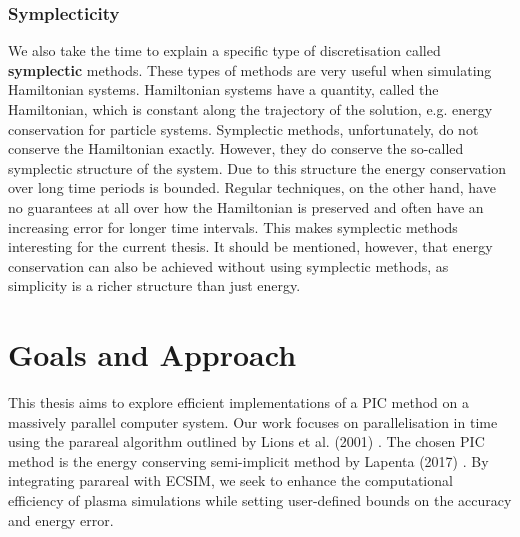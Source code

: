 \subsubsection{Symplecticity}
We also take the time to explain a specific type of discretisation called \textbf{symplectic} methods. These types of methods are very useful when simulating Hamiltonian systems. Hamiltonian systems have a quantity, called the Hamiltonian, which is constant along the trajectory of the solution, e.g. energy conservation for particle systems. Symplectic methods, unfortunately, do not conserve the Hamiltonian exactly. However, they do conserve the so-called symplectic structure of the system. Due to this structure the energy conservation over long time periods is bounded. Regular techniques, on the other hand, have no guarantees at all over how the Hamiltonian is preserved and often have an increasing error for longer time intervals. This makes symplectic methods interesting for the current thesis. It should be mentioned, however, that energy conservation can also be achieved without using symplectic methods, as simplicity is a richer structure than just energy\cite{giovanni_samaey_numerical_2022}.


\section{Goals and Approach}
\label{sec: goals and approach}
This thesis aims to explore efficient implementations of a PIC method on a massively parallel computer system. Our work focuses on parallelisation in time using the parareal algorithm outlined by Lions et al. (2001) \cite{lions_resolution_2001}. The chosen PIC method is the energy conserving semi-implicit method by Lapenta (2017) \cite{lapenta_exactly_2017}. By integrating parareal with ECSIM, we seek to enhance the computational efficiency of plasma simulations while setting user-defined bounds on the accuracy and energy error.



